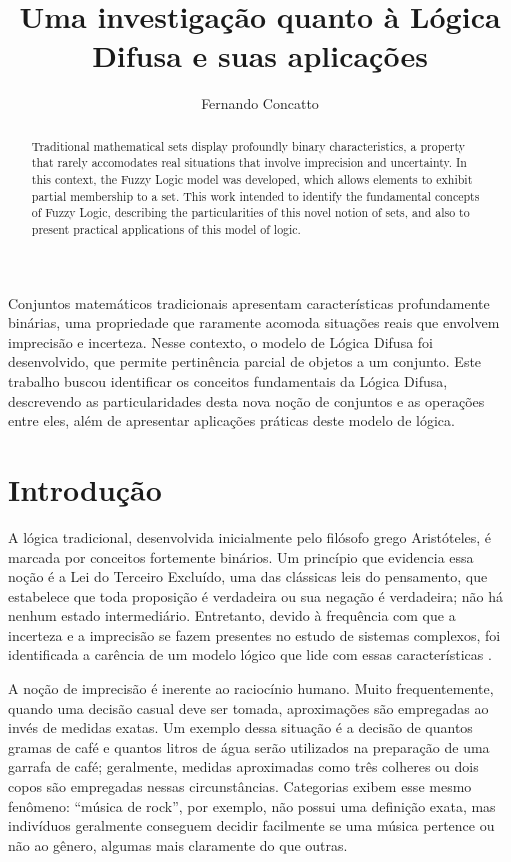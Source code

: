 \documentclass[12pt]{article}
\title{Uma investigação quanto à Lógica Difusa e suas aplicações}
\author{Fernando Concatto\inst{1}}
\begin{document}
\maketitle

\begin{abstract}
  Traditional mathematical sets display profoundly binary characteristics, a property that rarely accomodates real situations that involve imprecision and uncertainty. In this context, the Fuzzy Logic model was developed, which allows elements to exhibit partial membership to a set. This work intended to identify the fundamental concepts of Fuzzy Logic, describing the particularities of this novel notion of sets, and also to present practical applications of this model of logic.
\end{abstract}

\begin{resumo}
  Conjuntos matemáticos tradicionais apresentam características profundamente binárias, uma propriedade que raramente acomoda situações reais que envolvem imprecisão e incerteza. Nesse contexto, o modelo de Lógica Difusa foi desenvolvido, que permite pertinência parcial de objetos a um conjunto. Este trabalho buscou identificar os conceitos fundamentais da Lógica Difusa, descrevendo as particularidades desta nova noção de conjuntos e as operações entre eles, além de apresentar aplicações práticas deste modelo de lógica.
\end{resumo}

\section{Introdução} \label{sec:intro}

A lógica tradicional, desenvolvida inicialmente pelo filósofo grego Aristóteles, é marcada por conceitos fortemente binários. Um princípio que evidencia essa noção é a Lei do Terceiro Excluído, uma das clássicas leis do pensamento, que estabelece que toda proposição é verdadeira ou sua negação é verdadeira; não há nenhum estado intermediário. Entretanto, devido à frequência com que a incerteza e a imprecisão se fazem presentes no estudo de sistemas complexos, foi identificada a carência de um modelo lógico que lide com essas características \cite{Ross2010}.

A noção de imprecisão é inerente ao raciocínio humano. Muito frequentemente, quando uma decisão casual deve ser tomada, aproximações são empregadas ao invés de medidas exatas. Um exemplo dessa situação é a decisão de quantos gramas de café e quantos litros de água serão utilizados na preparação de uma garrafa de café; geralmente, medidas aproximadas como três colheres ou dois copos são empregadas nessas circunstâncias. Categorias exibem esse mesmo fenômeno: ``música de rock'', por exemplo, não possui uma definição exata, mas indivíduos geralmente conseguem decidir facilmente se uma música pertence ou não ao gênero, algumas mais claramente do que outras.
\end{document}
